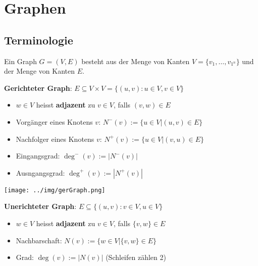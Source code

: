 \documentclass[german]{latex4ei/latex4ei_sheet}
\begin{document}
\newpage
\section{Graphen}

\begin{sectionbox}
\subsection{Terminologie}\smallskip
Ein Graph $G=(V,E)$ besteht aus der Menge von Kanten $V=\{v_{1},\ldots,v_{1^n}\}$ und der Menge von Kanten $E$.\par\smallskip

\textbf{Gerichteter Graph}: $E \subseteq V \times V=\{(u, v): u \in V, v \in V\}$\par
\begin{itemize}
    \item $w \in V$ heisst \textbf{adjazent} zu $v \in V$, falls $(v, w) \in E$
    \item Vorgänger eines Knotens $v$: $N^{-}(v):=\{u \in V |(u, v) \in E\}$
    \item Nachfolger eines Knotens $v$: $N^{+}(v):=\{u \in V |(v, u) \in E\}$
    \item Eingangsgrad: $\operatorname{deg}^{-}(v):=|N^{-}(v)|$
    \item Ausngangsgrad: $\operatorname{deg}^{+}(v):=|N^{+}(v)|$
\end{itemize}\par\smallskip
\begin{center}
    \texttt{[image: ../img/gerGraph.png]}
\end{center}\par\smallskip

\textbf{Unerichteter Graph}: $E \subseteq \{(u, v): v \in V, u \in V\}$\par
\begin{itemize}
    \item $w \in V$ heisst \textbf{adjazent} zu $v \in V$, falls $\{v, w\} \in E$
    \item Nachbarschaft: $N(v):=\{w \in V |\{v, w\} \in E\}$
    \item Grad: $\operatorname{deg}(v):=|N(v)|$ (Schleifen zählen 2)
\end{itemize}\par\smallskip


\end{sectionbox}
\end{document}
